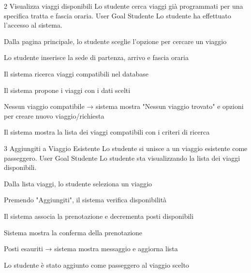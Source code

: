 \UseCase
{2}
{Visualizza viaggi disponibili}
{Lo studente cerca viaggi già programmati per una specifica tratta e fascia oraria.}
{User Goal}
{Studente}
{Lo studente ha effettuato l'accesso al sistema.}
{\begin{description}[nosep]
    \item[1.] Dalla pagina principale, lo studente sceglie l'opzione per cercare un viaggio
    \item[2.] Lo studente inserisce la sede di partenza, arrivo e fascia oraria
    \item[3.] Il sistema ricerca viaggi compatibili nel database
    \item[4.] Il sistema propone i viaggi con i dati scelti
\end{description}}
{\begin{description}[nosep]
    \item[4a.] Nessun viaggio compatibile → sistema mostra "Nessun viaggio trovato" e opzioni per creare nuovo viaggio/richiesta
\end{description}}
{Il sistema mostra la lista dei viaggi compatibili con i criteri di ricerca}

\UseCase
{3}
{Aggiungiti a Viaggio Esistente}
{Lo studente si unisce a un viaggio esistente come passeggero.}
{User Goal}
{Studente}
{Lo studente sta visualizzando la lista dei viaggi disponibili.}
{\begin{description}[nosep]
    \item[1.] Dalla lista viaggi, lo studente seleziona un viaggio
    \item[2.] Premendo "Aggiungiti", il sistema verifica disponibilità
    \item[3.] Il sistema associa la prenotazione e decrementa posti disponibili
    \item[4.] Sistema mostra la conferma della prenotazione
\end{description}}
{\begin{description}[nosep]
    \item[3a.] Posti esauriti → sistema mostra messaggio e aggiorna lista
\end{description}}
{Lo studente è stato aggiunto come passeggero al viaggio scelto}

